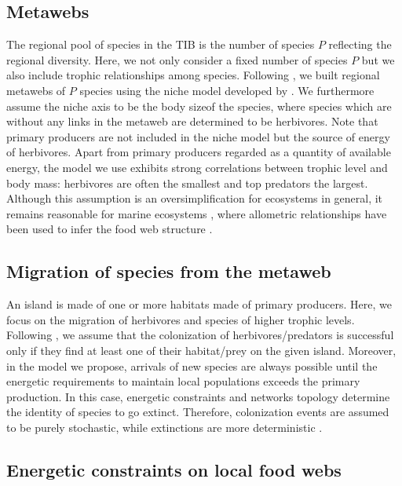 \subsection{Metawebs}\label{metawebs}

The regional pool of species in the TIB is the number of species \(P\)
reflecting the regional diversity. Here, we not only consider a fixed
number of species \(P\) but we also include trophic relationships among
species. Following \citet{Cazelles2015a}, we built regional metawebs of
\(P\) species using the niche model developed by \citet{Williams2000}.
We furthermore assume the niche axis to be the body sizeof the species,
where species which are without any links in the metaweb are determined
to be herbivores. Note that primary producers are not included in the
niche model but the source of energy of herbivores. Apart from primary
producers regarded as a quantity of available energy, the model we use
exhibits strong correlations between trophic level and body mass:
herbivores are often the smallest and top predators the largest.
Although this assumption is an oversimplification for ecosystems in
general, it remains reasonable for marine ecosystems
\citep{Trebilco2013}, where allometric relationships have been used to
infer the food web structure \citep{Gravel2013}.

\subsection{Migration of species from the
metaweb}\label{migration-of-species-from-the-metaweb}

An island is made of one or more habitats made of primary producers.
Here, we focus on the migration of herbivores and species of higher
trophic levels. Following \citet{Gravel2011}, we assume that the
colonization of herbivores/predators is successful only if they find at
least one of their habitat/prey on the given island. Moreover, in the
model we propose, arrivals of new species are always possible until the
energetic requirements to maintain local populations exceeds the primary
production. In this case, energetic constraints and networks topology
determine the identity of species to go extinct. Therefore, colonization
events are assumed to be purely stochastic, while extinctions are more
deterministic \citep[this difference in stochastic nature between these
fundamental processes of biogeography has been recently supported
in][]{Cirtwill2015}.

\subsection{Energetic constraints on local food
webs}\label{energetic-constraints-on-local-food-webs}

